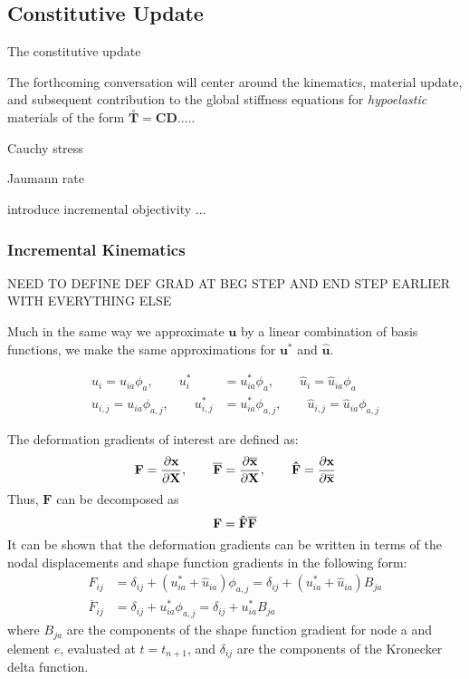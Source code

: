 \subsection{Constitutive Update}

The constitutive update 

The forthcoming conversation will center around the kinematics, material update, and subsequent contribution to the global stiffness equations for \textit{hypoelastic} materials of the form $\overset{\circ}{\bm{T}} = \bm{C}\bm{D}$.....

Cauchy stress

Jaumann rate

introduce incremental objectivity ...

\subsubsection{Incremental Kinematics}

NEED TO DEFINE DEF GRAD AT BEG STEP AND END STEP EARLIER WITH EVERYTHING ELSE

Much in the same way we approximate $\bm{u}$ by a linear combination of basis functions, we make the same approximations for $\bm{u}^*$ and $\hat{\bm{u}}$.

\begin{align}
u_i = u_{ia}\phi_a, \qquad u^*_i &= u^*_{ia}\phi_a, \qquad \hat{u}_i = \hat{u}_{ia}\phi_a \\
u_{i,j} = u_{ia}\phi_{a,j}, \qquad u^*_{i,j} &= u^*_{ia}\phi_{a,j}, \qquad \hat{u}_{i,j} = \hat{u}_{ia}\phi_{a,j}
\end{align}

The deformation gradients of interest are defined as:
\begin{equation}
\bf{F} = \frac{\partial \bf{x}}{\partial \bf{X}}, \qquad \bf{\overline{F}} = \frac{\partial \bf{\overline{x}}}{\partial \bf{X}}, \qquad \bf{\hat{F}} = \frac{\partial \bf{x}}{\partial \bf{\overline{x}}}
\end{equation}
Thus, $\mathbf{F}$ can be decomposed as
\begin{equation}
\bf{F} = \bf{\hat{F}}\bf{\overline{F}}
\end{equation}
It can be shown that the deformation gradients can be written in terms of the nodal displacements and shape function gradients in the following form:
\begin{align}
F_{ij} &= \delta_{ij} + \left(u^*_{ia} + \hat{u}_{ia} \right) \phi_{a,j} = \delta_{ij} + \left(u^*_{ia} + \hat{u}_{ia} \right) B_{ja} \\
\overline{F}_{ij} &= \delta_{ij} + u^*_{ia} \phi_{a,j} = \delta_{ij} + u^*_{ia} B_{ja}
\end{align}
where $B_{ja}$ are the components of the shape function gradient for node a and element $e$, evaluated at $t = t_{n+1}$, and $\delta_{ij}$ are the components of the Kronecker delta function.

